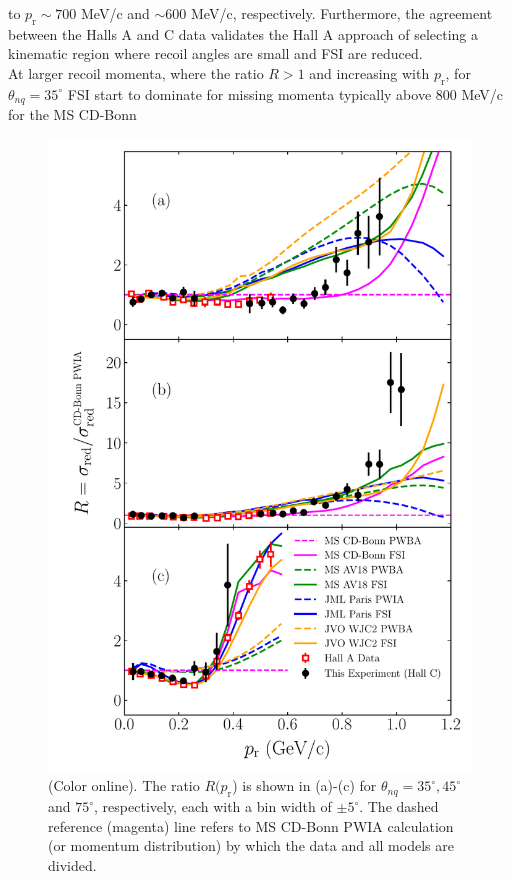 \documentclass[aps,prl,twocolumn,showpacs,superscriptaddress,groupedaddress,nofootinbib]{revtex4-2}  %
\begin{document}
to $p_{\mathrm{r}}\sim700$ MeV/c and $\sim600$ MeV/c, respectively. Furthermore, the agreement between the Halls A and C data validates the Hall A approach of selecting a kinematic
region where recoil angles are small and FSI are reduced. \\
\indent At larger recoil momenta, where the ratio $R>1$ and increasing with $p_{\mathrm{r}}$, for $\theta_{nq}=35^{\circ}$ FSI start to dominate for
missing momenta typically above 800 MeV/c for the MS CD-Bonn
\begin{figure}[!t]
\includegraphics[scale=0.5]{PRL_plot2.pdf}
\caption{(Color online). The ratio $R(p_{\mathrm{r}}$) is shown in (a)-(c) for $\theta_{nq}=35^{\circ}, 45^{\circ}$ and $75^{\circ}$, respectively, each with a bin width of $\pm 5^{\circ}$.
The dashed reference (magenta) line refers to MS CD-Bonn PWIA calculation (or momentum distribution) by which the data and all models are divided.}
\label{fig:fig2}
\end{figure}
\end{document}
